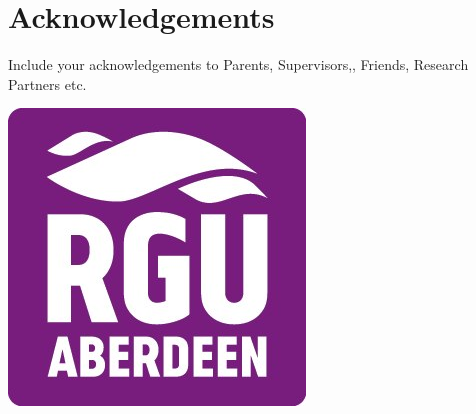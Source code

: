 \chapter{Acknowledgements}

Include your acknowledgements to Parents, Supervisors,, Friends, Research Partners etc.

\vfill
\begin{center}
	\includegraphics[scale=0.9]{images/rgu_logo2.jpg}
\end{center}
